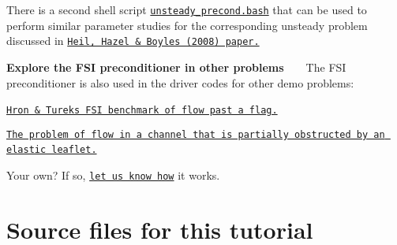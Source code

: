 \begin{DoxyEnumerate}
\begin{DoxyEnumerate}
\begin{DoxyItemize}
\end{DoxyItemize}
\end{DoxyEnumerate}There is a second shell script \href{../../../../demo_drivers/interaction/fsi_channel_seg_and_precond/unsteady_precond.bash}{\tt unsteady\+\_\+precond.\+bash} that can be used to perform similar parameter studies for the corresponding unsteady problem discussed in \href{http://www.springerlink.com/content/m3r6318701g338g4/}{\tt Heil, Hazel \& Boyle\textquotesingle{}s (2008) paper.} ~\newline
~\newline

\item {\bfseries Explore the F\+SI preconditioner in other problems} ~\newline
~\newline
 The F\+SI preconditioner is also used in the driver codes for other demo problems\+:~\newline
~\newline

\begin{DoxyItemize}
\item \href{../../../interaction/turek_flag/html/index.html}{\tt Hron \& Turek\textquotesingle{}s F\+SI benchmark of flow past a flag.}~\newline
~\newline

\item \href{../../../interaction/fsi_channel_with_leaflet/html/index.html}{\tt The problem of flow in a channel that is partially obstructed by an elastic leaflet.}~\newline
~\newline

\item Your own? If so, \href{../../../contact/html/index.html}{\tt let us know how} it works.
\end{DoxyItemize}
\end{DoxyEnumerate}

 

\hypertarget{index_sources}{}\section{Source files for this tutorial}\label{index_sources}

